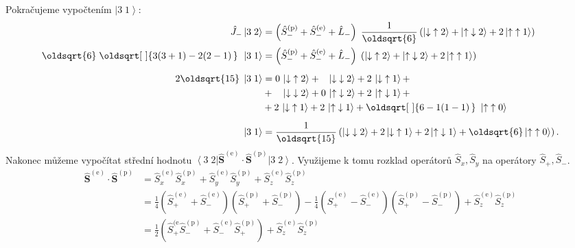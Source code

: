 \documentclass[10pt,a4paper]{article}
\renewcommand*{\sqrt}[2][\ ]{\oldsqrt[#1]{#2\,}\,}
\def\ph{\phantom}
\newcommand{\const}[1]{\text{#1}}
\newcommand{\bra}[1]{\left< #1 \right|}
\newcommand{\ket}[1]{\left| #1 \right>}
\newcommand{\bhat}[1]{\hat{\bm{#1}}}
\begin{document}
Pokračujeme vypočtením $\ket{3 \; 1}$:
\begin{align*}
    \hat{J}_{-} \ket{3 \; 2} &= \left( \hat{S}_{-}^{(\const{p})} + \hat{S}_{-}^{(\const{e})} + \hat{L}_{-} \right) \; \frac{1}{\oldsqrt{6}} \left( \ket{\downarrow \; \uparrow 2} + \ket{\uparrow \; \downarrow 2} + 2 \ket{\uparrow \; \uparrow 1} \right)
    \\
    \oldsqrt{6} \; \sqrt{3(3+1) - 2(2-1)} \; \ket{3 \; 1} &= \left( \hat{S}_{-}^{(\const{p})} + \hat{S}_{-}^{(\const{e})} + \hat{L}_{-} \right) \; \left( \ket{\downarrow \; \uparrow 2} + \ket{\uparrow \; \downarrow 2} + 2 \ket{\uparrow \; \uparrow 1} \right)
    \\[5pt]
    2 \oldsqrt{15} \; \ket{3 \; 1} &=
    0 \, \ket{\downarrow \; \uparrow 2} +
    \ph{0} \, \ket{\downarrow \; \downarrow 2} +
    2 \, \ket{\downarrow \; \uparrow 1} + \\
    &+ \ph{0} \; \ket{\downarrow \; \downarrow 2} +
    0 \, \ket{\uparrow \; \downarrow 2} +
    2 \, \ket{\uparrow \; \downarrow 1} + \\
    &+ 2 \, \ket{\downarrow \; \uparrow 1} +
    2 \, \ket{\uparrow \; \downarrow 1} +
    \sqrt{6 - 1(1-1)} \, \ket{\uparrow \; \uparrow 0}
    \\[5pt]
    \ket{3 \; 1} &= \frac{1}{\oldsqrt{15}} \left(
        \ket{\downarrow \; \downarrow 2} +
        2 \ket{\downarrow \; \uparrow 1} +
        2 \ket{\uparrow \; \downarrow 1} +
        \oldsqrt{6} \ket{\uparrow \; \uparrow 0}
    \right).
\end{align*}
Nakonec můžeme vypočítat střední hodnotu $\bra{3 \; 2} \bhat{S}^{(\const{e})} \cdot \bhat{S}^{(\const{p})} \ket{3 \; 2}$. Využijeme k tomu rozklad operátorů $\hat{S}_x, \hat{S}_y$ na operátory $\hat{S}_{+}, \hat{S}_{-}$.
\begin{align*}
    \bhat{S}^{(\const{e})} \cdot \bhat{S}^{(\const{p})}
    &= \hat{S}^{(\const{e})}_x \hat{S}^{(\const{p})}_x
    + \hat{S}^{(\const{e})}_y \hat{S}^{(\const{p})}_y
    + \hat{S}^{(\const{e})}_z \hat{S}^{(\const{p})}_z
    \\
    &= \frac{1}{4} \left( \hat{S}^{(\const{e})}_{+} + \hat{S}^{(\const{e})}_{-} \right) \left( \hat{S}^{(\const{p})}_{+} + \hat{S}^{(\const{p})}_{-} \right) - \frac{1}{4} \left( \hat{S}^{(\const{e})}_{+} - \hat{S}^{(\const{e})}_{-} \right) \left( \hat{S}^{(\const{p})}_{+} - \hat{S}^{(\const{p})}_{-} \right) + \hat{S}^{(\const{e})}_z \hat{S}^{(\const{p})}_z
    \\
    &= \frac{1}{2} \left( \hat{S}^{(\const{e}}_{+} \hat{S}^{(\const{p})}_{-} + \hat{S}^{(\const{e})}_{-} \hat{S}^{(\const{p})}_{+} \right) + \hat{S}^{(\const{e})}_z \hat{S}^{(\const{p})}_z
\end{align*}
\end{document}
